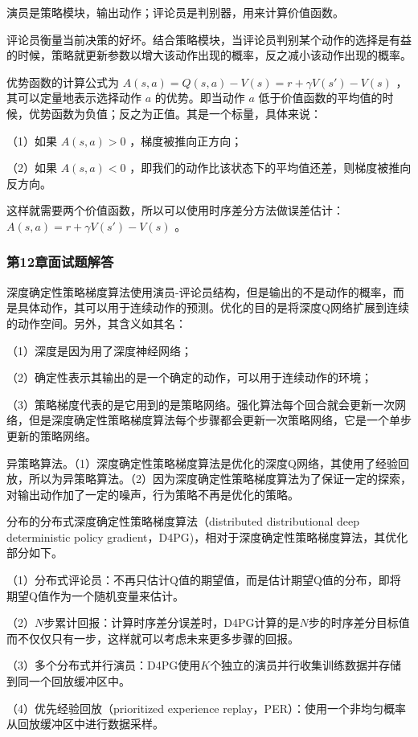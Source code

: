 
演员是策略模块，输出动作；评论员是判别器，用来计算价值函数。


评论员衡量当前决策的好坏。结合策略模块，当评论员判别某个动作的选择是有益的时候，策略就更新参数以增大该动作出现的概率，反之减小该动作出现的概率。


优势函数的计算公式为 $A(s,a)=Q(s,a)-V(s)=r+\gamma V(s')-V(s)$ ，其可以定量地表示选择动作 $a$ 的优势。即当动作 $a$ 低于价值函数的平均值的时候，优势函数为负值；反之为正值。其是一个标量，具体来说：

（1）如果 $A(s,a)>0$ ，梯度被推向正方向；

（2）如果 $A(s,a)<0$ ，即我们的动作比该状态下的平均值还差，则梯度被推向反方向。

这样就需要两个价值函数，所以可以使用时序差分方法做误差估计：$A(s,a)=r+\gamma V(s')-V(s)$ 。



\subsubsection*{第12章面试题解答}


深度确定性策略梯度算法使用演员-评论员结构，但是输出的不是动作的概率，而是具体动作，其可以用于连续动作的预测。优化的目的是将深度Q网络扩展到连续的动作空间。另外，其含义如其名：

（1）深度是因为用了深度神经网络；

（2）确定性表示其输出的是一个确定的动作，可以用于连续动作的环境；

（3）策略梯度代表的是它用到的是策略网络。强化算法每个回合就会更新一次网络，但是深度确定性策略梯度算法每个步骤都会更新一次策略网络，它是一个单步更新的策略网络。


异策略算法。（1）深度确定性策略梯度算法是优化的深度Q网络，其使用了经验回放，所以为异策略算法。（2）因为深度确定性策略梯度算法为了保证一定的探索，对输出动作加了一定的噪声，行为策略不再是优化的策略。
 

分布的分布式深度确定性策略梯度算法（distributed distributional deep deterministic policy gradient，D4PG)，相对于深度确定性策略梯度算法，其优化部分如下。 

（1）分布式评论员：不再只估计Q值的期望值，而是估计期望Q值的分布，即将期望Q值作为一个随机变量来估计。

（2）$N$步累计回报：计算时序差分误差时，D4PG计算的是$N$步的时序差分目标值而不仅仅只有一步，这样就可以考虑未来更多步骤的回报。

（3）多个分布式并行演员：D4PG使用$K$个独立的演员并行收集训练数据并存储到同一个回放缓冲区中。

（4）优先经验回放（prioritized experience replay，PER）：使用一个非均匀概率从回放缓冲区中进行数据采样。
